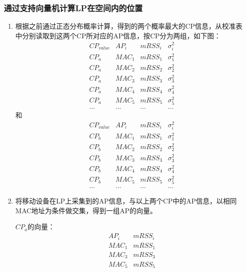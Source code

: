 \documentclass[UTF8, twocolumn ]{ctexart}
\begin{document}
\subsubsection{通过支持向量机计算LP在空间内的位置}
\begin{enumerate}
\item 根据之前通过正态分布概率计算，得到的两个概率最大的CP信息，从校准表中分别读取到这两个CP所对应的AP信息，按CP分为两组，如下图：
\begin{displaymath}
\begin{array}{c|c|c|c}
CP_{value} & AP_{i} & mRSS_{i} & \sigma^{2}_{i} \\ \hline
CP_{a} & MAC_{1} & mRSS_{1} & \sigma^{2}_{1} \\
CP_{a} & MAC_{2} & mRSS_{2} & \sigma^{2}_{2} \\
CP_{a} & MAC_{3} & mRSS_{3} & \sigma^{2}_{3} \\
CP_{a} & MAC_{4} & mRSS_{4} & \sigma^{2}_{4} \\
CP_{a} & MAC_{5} & mRSS_{5} & \sigma^{2}_{5} \\
... & ... & ... & ...
\end{array}
\end{displaymath}
和
\begin{displaymath}
\begin{array}{c|c|c|c}
CP_{value} & AP_{i} & mRSS_{i} & \sigma^{2}_{i} \\ \hline
CP_{b} & MAC_{1} & mRSS_{1} & \sigma^{2}_{1} \\
CP_{b} & MAC_{2} & mRSS_{2} & \sigma^{2}_{2} \\
CP_{b} & MAC_{3} & mRSS_{3} & \sigma^{2}_{3} \\
CP_{b} & MAC_{4} & mRSS_{4} & \sigma^{2}_{4} \\
CP_{b} & MAC_{5} & mRSS_{5} & \sigma^{2}_{5} \\
... & ... & ... & ...
\end{array}
\end{displaymath}
\item 将移动设备在LP上采集到的AP信息，与以上两个CP中的AP信息，以相同MAC地址为条件做交集，得到一组AP的向量。
\par
$CP_{a}$的向量：
\begin{displaymath}
\begin{array}{c|c}
AP_{i} & mRSS_{i} \\ \hline
MAC_{1} & mRSS_{1} \\
MAC_{3} & mRSS_{3} \\
MAC_{5} & mRSS_{5} \\

\end{array}
\end{displaymath}
\end{enumerate}
\end{document}
